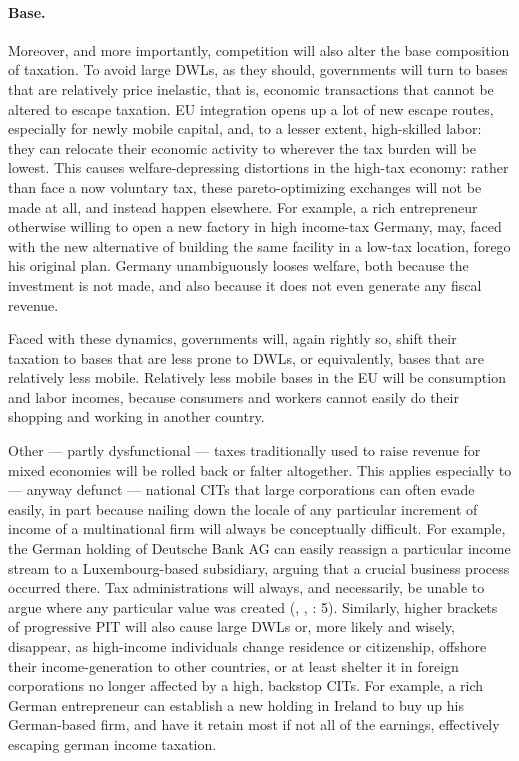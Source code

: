 \documentclass[11pt,a4paper,oneside,openright]{article}
\begin{document}

\paragraph{Base.} Moreover, and more importantly, competition will also alter the base composition of taxation. 
To avoid large \glspl{DWL}, as they should, governments will turn to bases that are relatively price inelastic, that is, economic transactions that cannot be altered to escape taxation. 
\gls{EU} integration opens up a lot of new escape routes, especially for newly mobile capital, and, to a lesser extent, high-skilled labor: 
they can relocate their economic activity to wherever the tax burden will be lowest. 
This causes welfare-depressing distortions in the high-tax economy: 
rather than face a now voluntary tax, these pareto-optimizing exchanges will not be made at all, and instead happen elsewhere. 
For example, a rich entrepreneur otherwise willing to open a new factory in high income-tax Germany, may, faced with the new alternative of building the same facility in a low-tax location, forego his original plan. 
Germany unambiguously looses welfare, both because the investment is not made, and also because it does not even generate any fiscal revenue.

Faced with these dynamics, governments will, again rightly so, shift their taxation to bases that are less prone to \glspl{DWL}, or equivalently, bases that are relatively less mobile. 
Relatively less mobile bases in the \gls{EU} will be consumption and labor incomes, because consumers and workers cannot easily do their shopping and working in another country. 

Other --- partly dysfunctional --- taxes traditionally used to raise revenue for mixed economies will be rolled back or falter altogether. 
This applies especially to --- anyway defunct --- national \glspl{CIT} that large corporations can often evade easily, in part because nailing down the locale of any particular increment of income of a multinational firm will always be conceptually difficult. 
For example, the German holding of Deutsche Bank AG can easily reassign a particular income stream to a Luxembourg-based subsidiary, arguing that a crucial business process occurred there. 
Tax administrations will always, and necessarily, be unable to argue where any particular value was created (\citealt{Ganghof2006}, \citealt{Ganghof}, \citealt{Ganghof2007}: 5). 
Similarly, higher brackets of progressive \gls{PIT} will also cause large \glspl{DWL} or, more likely and wisely, disappear, as high-income individuals change residence or citizenship, offshore their income-generation to other countries, or at least shelter it in foreign corporations no longer affected by a high, backstop \glspl{CIT}. 
For example, a rich German entrepreneur can establish a new holding in Ireland to buy up his German-based firm, and have it retain most if not all of the earnings, effectively escaping german income taxation. 
\end{document}
